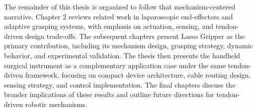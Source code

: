 The remainder of this thesis is organized to follow that mechanism-centered narrative. Chapter 2 reviews related work in laparoscopic end-effectors and adaptive grasping systems, with emphasis on actuation, sensing, and tendon-driven design trade-offs. The subsequent chapters present Lasso Gripper as the primary contribution, including its mechanism design, grasping strategy, dynamic behavior, and experimental validation. The thesis then presents the handheld surgical instrument as a complementary application case under the same tendon-driven framework, focusing on compact device architecture, cable routing design, sensing strategy, and control implementation. The final chapters discuss the broader implications of these results and outline future directions for tendon-driven robotic mechanisms.

\let\cleardoublepage\clearpage
